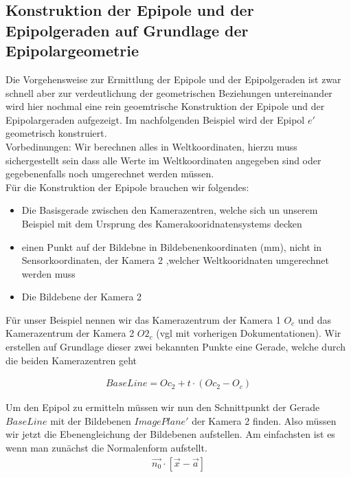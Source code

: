 \subsection{Konstruktion der Epipole und der Epipolgeraden auf Grundlage der Epipolargeometrie}
	Die Vorgehensweise zur Ermittlung der Epipole und der Epipolgeraden ist zwar schnell aber zur verdeutlichung der geometrischen Beziehungen untereinander wird hier nochmal eine rein geoemtrische Konstruktion der Epipole und der Epipolargeraden aufgezeigt. Im nachfolgenden Beispiel wird der Epipol \ensuremath{e'} geometrisch konstruiert. \\

Vorbedinungen: Wir berechnen alles in Weltkoordinaten, hierzu muss sichergestellt sein dass alle Werte im Weltkoordinaten angegeben sind oder gegebenenfalls noch umgerechnet werden müssen. \\
Für die Konstruktion der Epipole brauchen wir folgendes:
\begin{itemize}
	\item Die Basisgerade zwischen den Kamerazentren, welche sich un unserem Beispiel mit dem Ursprung des Kamerakooridnatensystems decken
	\item einen Punkt auf der Bildebne in Bildebenenkoordinaten (mm), nicht in Sensorkoordinaten, der Kamera 2 ,welcher Weltkooridnaten umgerechnet werden muss
	\item Die Bildebene der Kamera 2 
\end{itemize}

Für unser Beispiel nennen wir das Kamerazentrum der Kamera 1 \ensuremath{O_c} und das Kamerazentrum der Kamera 2 \ensuremath{O2_c} (vgl mit vorherigen Dokumentationen). Wir erstellen auf Grundlage dieser zwei bekannten Punkte eine Gerade, welche durch die beiden Kamerazentren geht

\begin{gather}
BaseLine = Oc_2 + t\cdot (Oc_2-O_c)
\end{gather}

Um den Epipol zu ermitteln müssen wir nun den Schnittpunkt der Gerade \ensuremath{BaseLine} mit der Bildebenen \ensuremath{ImagePlane'} der Kamera 2 finden. Also müssen wir jetzt die Ebenengleichung der Bildebenen aufstellen. Am einfachsten ist es wenn man zunächst die Normalenform aufstellt.\\

\begin{gather}
\vec{n_0}\cdot[\vec{x}-\vec{a}]
\end{gather}

